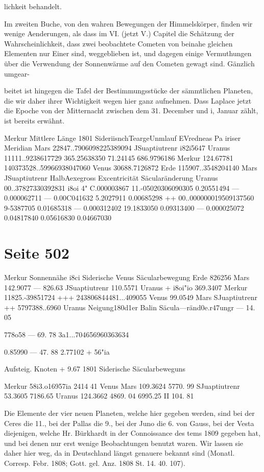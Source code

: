\documentclass[10pt,a4paper]{article}
\begin{document}
lichkeit behandelt.

Im zweiten Buche, von den wahren Bewegungen der Himmelskörper, finden wir wenige Aenderungen, als dass im VI. (jetzt V.) Capitel die Schätzung der Wahrscheinlichkeit, dass zwei beobachtete Cometen von beinahe gleichen Elementen nur Einer sind, weggeblieben ist, und dagegen einige Vermuthungen über die Verwendung der Sonnenwärme auf den Cometen gewagt sind. Gänzlich umgear-

beitet ist hingegen die Tafel der Bestimmungsstücke der sämmtlichen Planeten, die wir daher ihrer Wichtigkeit wegen hier ganz aufnehmen. Dass Laplace jetzt die Epoche von der Mitternacht zwischen dem 31. December und i, Januar zählt, ist bereits erwähnt.

Merkur Mittlere Länge 1801 SideriisnchTeargeUnmlauf EVredneas Pa iriser Meridian Mars 22847..7906098225389094 JSuaptiutrenr i82\textdegree{}i5647 Uranus 11111..9238617729 365.25638350 71.24145 686.9796186 Merkur 124.67781 140373528..59966938047060 Venus 30688.7126872 Erde 115907..3548204140 Mars JSuaptiutrenr HalbAexegross Excentricität Säcularänderung Uranus 00..37827330392831 i8oi 4" C.000003867 11.-05020306090305 0.20551494 — 0.000062711 — 0.00C041632 5.2027911 0.00685298 ++ 00..000000019509137560 9-5387705 0.01685318 — 0.000312402 19.1833050 0.09313400 — 0.000025072 0.04817840 0.05616830 0.04667030


\newpage
\section*{Seite 502}
Merkur Sonnennähe i8ci Siderische Venus Säcularbewegung Erde 82\textdegree{}6256 Mars 142.9077 — 826.63 JSuaptiutrenr 110.5571 Uranus + i8oi"io 369.3407 Merkur 11825.-39851724 +++ 243806844481...409055 Venus 99.0549 Mars SJuaptiutrenr ++ 5797388..6960 Uranus Neigung180d1er Balin Säcula—ränd0e.r47ungr — 14. 05

7\textdegree{}78o58 — 69. 78 3a1...704656960363634

0.85990 — 47. 88 2.77102 + 56"ia

Aufsteig. Knoten + 9.67 1801 Siderische Säcularbeweguns

Merkur 58i3\textdegree{}.o16957ia 2414 41 Venus Mars 109.3624 5770. 99 SJuaptiutrenr 53.3605 7186.65 Uranus 124.3662 4869. 04 6995.25 II 104. 81

Die Elemente der vier neuen Planeten, welche hier gegeben werden, sind bei der Ceres die 11., bei der Pallas die 9., bei der Juno die 6. von Gauss, bei der Vesta diejenigen, welche Hr. Bürkhardt in der Connoissance des tems 1809 gegeben hat, und bei denen nur erst wenige Beobachtungen benutzt waren. Wir lassen sie daher hier weg, da in Deutschland längst genauere bekannt sind (Monatl. Corresp. Febr. 1808; Gott. gel. Anz. 1808 St. 14. 40. 107).
\end{document}
